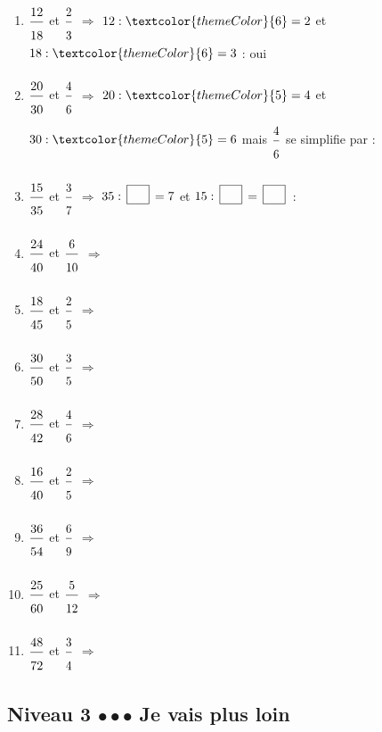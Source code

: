 \newpage
{}
 
\begin{enumerate}[leftmargin=*,align=parleft, label=\alph*), itemsep=9pt]
\item $\FA{12}{18}$ et $\FA{2}{3}$ \quad $\Longrightarrow$ \quad $12 : \textcolor{themeColor}{6}=2$ \quad et \quad $18 : \textcolor{themeColor}{6}=3$ \quad : \quad \textcolor{themeColor}{oui}
\item $\FA{20}{30}$ et $\FA{4}{6}$ \quad $\Longrightarrow$ \quad $20 : \textcolor{themeColor}{5}=4$ \quad et \quad $30 : \textcolor{themeColor}{5}=6$ \quad mais \quad $\FA{4}{6}$ se simplifie par \CaseC \quad : \quad \Case
\item $\FA{15}{35}$ et $\FA{3}{7}$ \quad $\Longrightarrow$ \quad $35 : \CaseC=7$ \quad et \quad $15 : \CaseC=\CaseC$ \quad : \quad \Case
\item $\FA{24}{40}$ et $\FA{6}{10}$ \quad $\Longrightarrow$
\item $\FA{18}{45}$ et $\FA{2}{5}$ \quad $\Longrightarrow$
\item $\FA{30}{50}$ et $\FA{3}{5}$ \quad $\Longrightarrow$
\item $\FA{28}{42}$ et $\FA{4}{6}$ \quad $\Longrightarrow$
\item $\FA{16}{40}$ et $\FA{2}{5}$ \quad $\Longrightarrow$
\item $\FA{36}{54}$ et $\FA{6}{9}$ \quad $\Longrightarrow$
\item $\FA{25}{60}$ et $\FA{5}{12}$ \quad $\Longrightarrow$
\item $\FA{48}{72}$ et $\FA{3}{4}$ \quad $\Longrightarrow$
\end{enumerate}
 
\newpage
\subsection{Niveau 3 \quad $\bullet\bullet\bullet$ \quad Je vais plus loin}
 

